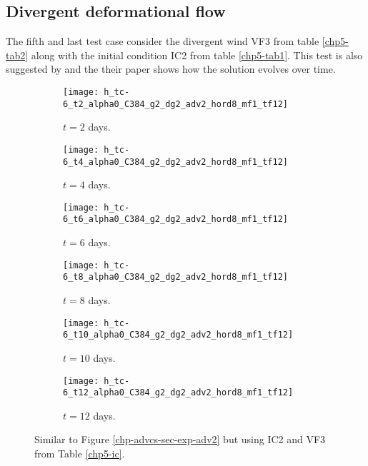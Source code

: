 \subsection{Divergent deformational flow}
The fifth and last test case consider the divergent wind VF3 from table \ref{chp5-tab2} along with
the initial condition IC2 from table \ref{chp5-tab1}.
This test is also suggested by \citet{nair:2010} and the their paper shows how the solution evolves over time.
\begin{figure}[!htb]
	\centering
	\begin{subfigure}{0.45\textwidth}
		\centering
		\texttt{[image: h\_tc-6\_t2\_alpha0\_C384\_g2\_dg2\_adv2\_hord8\_mf1\_tf12]}
		\caption{$t=2$ days.\label{chp-advcs-sec-exp-adv4-a}}
	\end{subfigure}
	\begin{subfigure}{0.45\textwidth}
		\centering
		\texttt{[image: h\_tc-6\_t4\_alpha0\_C384\_g2\_dg2\_adv2\_hord8\_mf1\_tf12]}
		\caption{$t=4$ days.\label{chp-advcs-sec-exp-adv4-b}}
	\end{subfigure}

	\begin{subfigure}{0.45\textwidth}
		\centering
		\texttt{[image: h\_tc-6\_t6\_alpha0\_C384\_g2\_dg2\_adv2\_hord8\_mf1\_tf12]}
		\caption{$t=6$ days.\label{chp-advcs-sec-exp-adv4-c}}
	\end{subfigure}
	\begin{subfigure}{0.45\textwidth}
		\centering
		\texttt{[image: h\_tc-6\_t8\_alpha0\_C384\_g2\_dg2\_adv2\_hord8\_mf1\_tf12]}
		\caption{$t=8$ days.\label{chp-advcs-sec-exp-adv4-d}}
	\end{subfigure}

	\begin{subfigure}{0.45\textwidth}
		\centering
		\texttt{[image: h\_tc-6\_t10\_alpha0\_C384\_g2\_dg2\_adv2\_hord8\_mf1\_tf12]}
		\caption{$t=10$ days.\label{chp-advcs-sec-exp-adv4-e}}
	\end{subfigure}
	\begin{subfigure}{0.45\textwidth}
		\centering
		\texttt{[image: h\_tc-6\_t12\_alpha0\_C384\_g2\_dg2\_adv2\_hord8\_mf1\_tf12]}
		\caption{$t=12$ days.\label{chp-advcs-sec-exp-adv4-f}}
	\end{subfigure}
	\caption{Similar to Figure \ref{chp-advcs-sec-exp-adv2} but using IC2 and VF3 from Table \ref{chp5-ic}.\label{chp-advcs-sec-exp-adv4}}
\end{figure}

